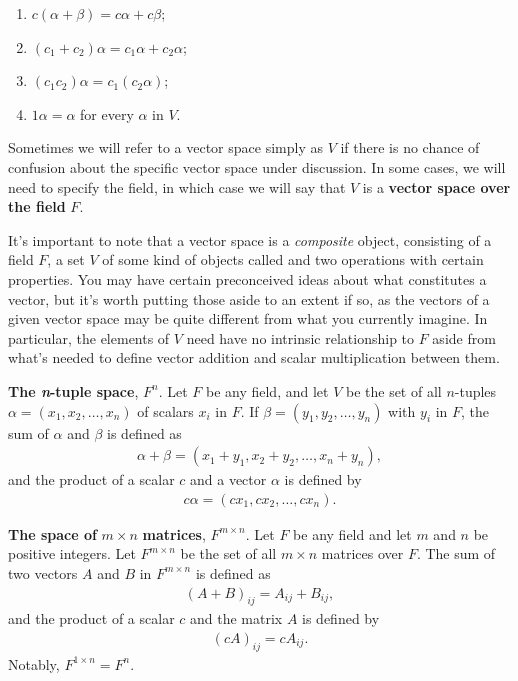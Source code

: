 \documentclass[12pt]{article}
\begin{document}
\begin{defn}
\begin{enumerate}
\begin{enumerate}
        \item
          $c(\alpha + \beta) = c\alpha + c\beta$;
        \item
           $(c_1 +c_2)\alpha = c_1\alpha + c_2\alpha$;
        \item
          $(c_1c_2)\alpha = c_1(c_2\alpha)$;
        \item
          $1\alpha = \alpha$ for every $\alpha$ in $V$.
      \end{enumerate}
  \end{enumerate}
  Sometimes we will refer to a vector space simply as $V$ if
  there is no chance of confusion about the specific vector space
  under discussion. In some cases, we will need to specify the
  field, in which case we will say that $V$ is a \textbf{vector
  space over the field} $F$.
\end{defn}

\begin{comm}
  It's important to note that a vector space is a
  \textit{composite} object, consisting of a field $F$, a set $V$
  of some kind of objects called  and two
  operations with certain properties. You may have certain
  preconceived ideas about what constitutes a vector, but it's
  worth putting those aside to an extent if so, as the vectors of
  a given vector space may be quite different from what you
  currently imagine. In particular, the elements of $V$ need have
  no intrinsic relationship to $F$ aside from what's needed to
  define vector addition and scalar multiplication between them.
\end{comm}

\begin{exm}
  \textbf{The \textit{n}-tuple space}, $F^n$. Let $F$ be any
  field, and let $V$ be the set of all $n$-tuples $\alpha =
  (x_1,x_2,\ldots,x_n)$ of scalars $x_i$ in $F$. If $\beta =
  (y_1,y_2,\ldots,y_n)$ with $y_i$ in $F$, the sum of $\alpha$
  and $\beta$ is defined as
  \begin{align*}
    \alpha + \beta = (x_1 + y_1,x_2 + y_2,\ldots,x_n + y_n),
  \end{align*}
  and the product of a scalar $c$ and a vector $\alpha$ is
  defined by
  \begin{align*}
    c\alpha = (cx_1,cx_2,\ldots,cx_n).
  \end{align*}
\end{exm}

\begin{exm}
  \textbf{The space of} $m \times n$ \textbf{matrices}, $F^{m
  \times n}$. Let $F$ be any field and let $m$ and $n$ be
  positive integers. Let $F^{m \times n}$ be the set of all $m
  \times n$ matrices over $F$. The sum of two vectors $A$ and $B$
  in $F^{m \times n}$ is defined as
  \begin{align*}
    (A + B)_{ij} = A_{ij} + B_{ij},
  \end{align*}
  and the product of a scalar $c$ and the matrix $A$ is defined
  by
  \begin{align*}
    (cA)_{ij} = cA_{ij}.
  \end{align*}
  Notably, $F^{1 \times n} = F^n$.
\end{exm}
\end{document}
